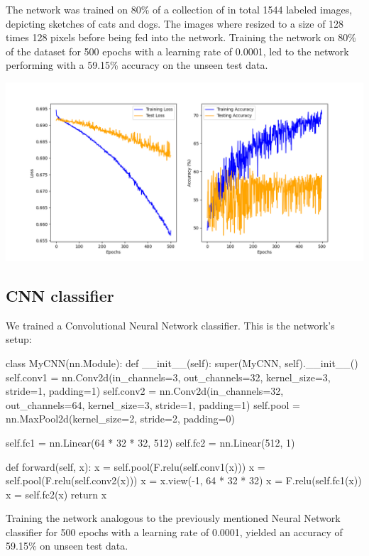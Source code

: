 The network was trained on 80\% of a collection of in total 1544 labeled images,
depicting sketches of cats and dogs. The images where resized to a size of
128 times 128 pixels before being fed into the network. Training the network on
80\% of the dataset for 500 epochs with a learning rate of 0.0001, led to the
network performing with a 59.15\% accuracy on the unseen test data.

\includegraphics[width=\textwidth]{Figures/NN_classifier_charts.png}

\subsection*{CNN classifier}

We trained a Convolutional Neural Network classifier. This is the network's
setup:

\begin{python}
    class MyCNN(nn.Module):
    def __init__(self):
        super(MyCNN, self).__init__()
        self.conv1 = nn.Conv2d(in_channels=3, out_channels=32,
        kernel_size=3, stride=1,
        padding=1)
        self.conv2 = nn.Conv2d(in_channels=32, out_channels=64,
        kernel_size=3,
        stride=1,
        padding=1)
        self.pool = nn.MaxPool2d(kernel_size=2, stride=2, padding=0)

        self.fc1 = nn.Linear(64 * 32 * 32, 512)
        self.fc2 = nn.Linear(512, 1)

    def forward(self, x):
        x = self.pool(F.relu(self.conv1(x)))
        x = self.pool(F.relu(self.conv2(x)))
        x = x.view(-1, 64 * 32 * 32)
        x = F.relu(self.fc1(x))
        x = self.fc2(x)
        return x
\end{python}

Training the network analogous to the previously mentioned Neural Network
classifier for 500 epochs with a learning rate of 0.0001, yielded an accuracy of
59.15\% on unseen test data.

